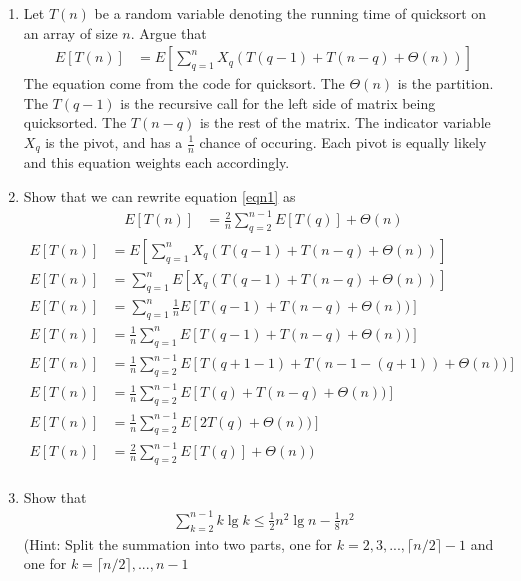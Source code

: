 \documentclass{article}
\begin{document}
\begin{enumerate}
\begin{enumerate}
      \item
        Let $T(n)$ be a random variable denoting the running time of
        quicksort on an array of size $n$.  Argue that
        \begin{align}
        E[T(n)] &= E\left[
          \sum_{q=1}^n X_q(T(q-1) + T(n-q) + \Theta(n))
          \right]
        \label{eqn1}
        \end{align}
        The equation come from the code for quicksort. 
        The $\Theta(n)$ is the partition.
        The $T(q-1)$ is the recursive call for the left side of matrix being quicksorted. 
        The $T(n-q)$ is the rest of the matrix. 
        The indicator variable $X_q$ is the pivot, and has a $\frac{1}{n}$ chance of occuring.
        Each pivot is equally likely and this equation weights each accordingly.
        \newpage
      \item
        Show that we can rewrite equation \ref{eqn1} as
        \begin{align}
          E[T(n)] &= \frac{2}{n}\sum_{q=2}^{n-1}E[T(q)] + \Theta(n)
            \label{eqn2}            
        \end{align}
        \begin{align*}
          E[T(n)] &= E\left[
          \sum_{q=1}^n X_q(T(q-1) + T(n-q) + \Theta(n))
          \right] \\
        E[T(n)] &= 
          \sum_{q=1}^n E\left[ X_q(T(q-1) + T(n-q) + \Theta(n))
          \right] \\
        E[T(n)] &= 
          \sum_{q=1}^n \frac{1}{n}E\left[ T(q-1) + T(n-q) + \Theta(n))
          \right]\\
        E[T(n)] &= 
        \frac{1}{n}\sum_{q=1}^n E\left[ T(q-1) + T(n-q) + \Theta(n))
        \right]\\
        E[T(n)] &= 
        \frac{1}{n}\sum_{q=2}^{n - 1} E\left[ T(q + 1 -1) + T(n - 1 -(q + 1)) + \Theta(n)) 
        \right]\\
        E[T(n)] &= 
        \frac{1}{n}\sum_{q=2}^{n - 1} E\left[ T(q) + T(n-q) + \Theta(n)) 
        \right]\\
        E[T(n)] &= 
        \frac{1}{n}\sum_{q=2}^{n - 1} E\left[ 2T(q) + \Theta(n)) 
        \right]\\
        E[T(n)] &= 
        \frac{2}{n}\sum_{q=2}^{n - 1} E\left[ T(q)\right] + \Theta(n)) 
        \\
        \end{align*}
  
      \item
        Show that
        \begin{align}
          \sum_{k=2}^{n-1} k \lg k \leq \frac{1}{2}n^2\lg n -
          \frac{1}{8} n^2
          \label{eqn3}
        \end{align}
        (Hint: Split the summation into two parts, one for
        $k=2,3,...,\lceil n/2 \rceil - 1$
        and one for
        $k= \lceil n/2\rceil,...,n-1$
  

\end{enumerate}
\end{enumerate}
\end{document}
